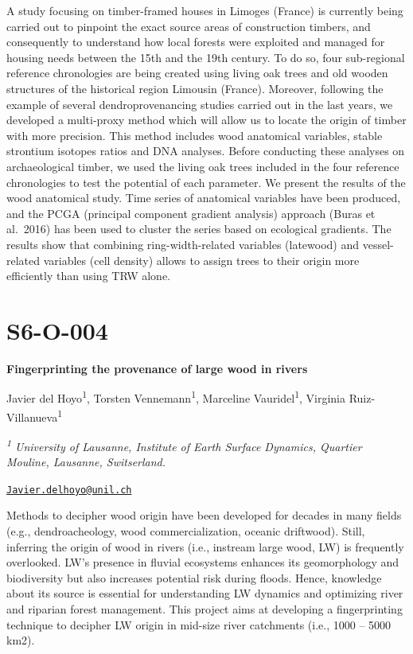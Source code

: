 \documentclass[
]{book}
\begin{document}
A study focusing on timber-framed houses in Limoges (France) is currently being carried out to pinpoint the exact source areas of construction timbers, and consequently to understand how local forests were exploited and managed for housing needs between the 15th and the 19th century. To do so, four sub-regional reference chronologies are being created using living oak trees and old wooden structures of the historical region Limousin (France). Moreover, following the example of several dendroprovenancing studies carried out in the last years, we developed a multi-proxy method which will allow us to locate the origin of timber with more precision. This method includes wood anatomical variables, stable strontium isotopes ratios and DNA analyses. Before conducting these analyses on archaeological timber, we used the living oak trees included in the four reference chronologies to test the potential of each parameter. We present the results of the wood anatomical study. Time series of anatomical variables have been produced, and the PCGA (principal component gradient analysis) approach (Buras et al.~2016) has been used to cluster the series based on ecological gradients. The results show that combining ring-width-related variables (latewood) and vessel-related variables (cell density) allows to assign trees to their origin more efficiently than using TRW alone.

\hypertarget{s6-o-004}{%
\section*{S6-O-004}\label{s6-o-004}}

\textbf{Fingerprinting the provenance of large wood in rivers}

Javier del Hoyo\textsuperscript{1}, Torsten Vennemann\textsuperscript{1}, Marceline Vauridel\textsuperscript{1}, Virginia Ruiz-Villanueva\textsuperscript{1}

\emph{\textsuperscript{1} University of Lausanne, Institute of Earth Surface Dynamics, Quartier Mouline, Lausanne, Switserland.}

\href{mailto:Javier.delhoyo@unil.ch}{\nolinkurl{Javier.delhoyo@unil.ch}}

Methods to decipher wood origin have been developed for decades in many fields (e.g., dendroacheology, wood commercialization, oceanic driftwood). Still, inferring the origin of wood in rivers (i.e., instream large wood, LW) is frequently overlooked. LW's presence in fluvial ecosystems enhances its geomorphology and biodiversity but also increases potential risk during floods. Hence, knowledge about its source is essential for understanding LW dynamics and optimizing river and riparian forest management. This project aims at developing a fingerprinting technique to decipher LW origin in mid-size river catchments (i.e., 1000 -- 5000 km2).
\end{document}
